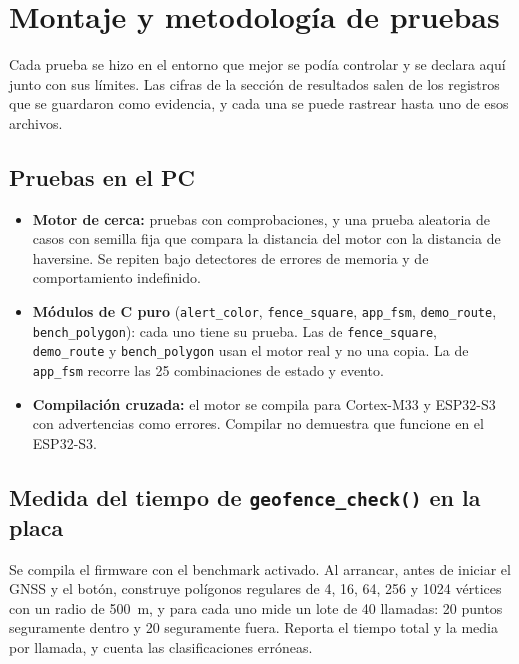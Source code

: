 \section{Montaje y metodología de pruebas}

Cada prueba se hizo en el entorno que mejor se podía controlar y se declara aquí junto con sus
límites. Las cifras de la sección de resultados salen de los registros que se guardaron como
evidencia, y cada una se puede rastrear hasta uno de esos archivos.

\subsection{Pruebas en el PC}

\begin{itemize}
  \item \textbf{Motor de cerca:} \dHostTests{} pruebas con \dHostChecks{} comprobaciones, y una prueba
        aleatoria de \dStressCases{} casos con semilla fija que compara la distancia del motor con
        la distancia de haversine. Se repiten bajo detectores de errores de memoria y de comportamiento
        indefinido.
  \item \textbf{Módulos de C puro} (\texttt{alert\_color}, \texttt{fence\_square}, \texttt{app\_fsm},
        \texttt{demo\_route}, \texttt{bench\_polygon}): cada uno tiene su prueba. Las de
        \texttt{fence\_square}, \texttt{demo\_route} y \texttt{bench\_polygon} usan el motor real y no
        una copia. La de \texttt{app\_fsm} recorre las 25 combinaciones de estado y evento.
  \item \textbf{Compilación cruzada:} el motor se compila para Cortex-M33 y ESP32-S3 con advertencias
        como errores. Compilar no demuestra que funcione en el ESP32-S3.
\end{itemize}

\subsection{Medida del tiempo de \texttt{geofence\_check()} en la placa}

Se compila el firmware con el benchmark activado. Al arrancar, antes de iniciar el GNSS y el botón,
construye polígonos regulares de 4, 16, 64, 256 y 1024 vértices con un radio de 500~m, y para cada uno
mide un lote de 40 llamadas: 20 puntos seguramente dentro y 20 seguramente fuera. Reporta el tiempo
total y la media por llamada, y cuenta las clasificaciones erróneas.

